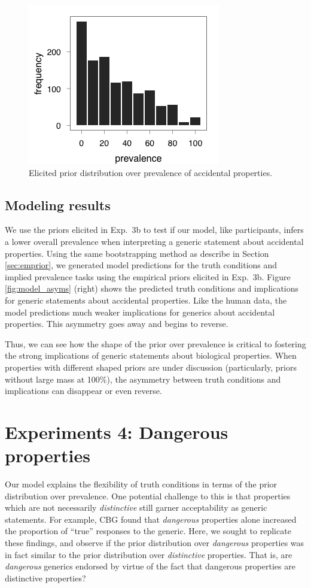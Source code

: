 \documentclass[10pt,letterpaper]{article}
\begin{document}
\begin{figure}
\centering
    \includegraphics[width=0.5\columnwidth]{accidental_priors}
    \caption{Elicited prior distribution over prevalence of accidental properties.}
  \label{fig:accidentalpriors}
\end{figure}


\subsection{Modeling results}

We use the priors elicited in Exp.~3b to test if our model, like participants, infers a lower overall prevalence when interpreting a generic statement about accidental properties. Using the same bootstrapping method as describe in Section \ref{sec:emprior}, we generated model predictions for the truth conditions and implied prevalence tasks using the empirical priors elicited in Exp.~3b. Figure \ref{fig:model_asyms} (right) shows the predicted truth conditions and implications for generic statements about accidental properties. Like the human data, the model predictions much weaker implications for generics about accidental properties. This asymmetry goes away and begins to reverse.

Thus, we can see how the shape of the prior over prevalence is critical to fostering the strong implications of generic statements about biological properties. When properties with different shaped priors are under discussion (particularly, priors without large mass at 100\%), the asymmetry between truth conditions and implications can disappear or even reverse.

\section{Experiments 4: Dangerous properties}

Our model explains the flexibility of truth conditions in terms of the prior distribution over prevalence. One potential challenge to this is that properties which are not necessarily \emph{distinctive} still garner acceptability as generic statements. For example, CBG found that \emph{dangerous} properties alone increased the proportion of ``true'' responses to the generic. Here, we sought to replicate these findings, and observe if the prior distribution over \emph{dangerous} properties was in fact similar to the prior distribution over \emph{distinctive} properties. That is, are \emph{dangerous} generics endorsed by virtue of the fact that dangerous properties are distinctive properties?
\end{document}
